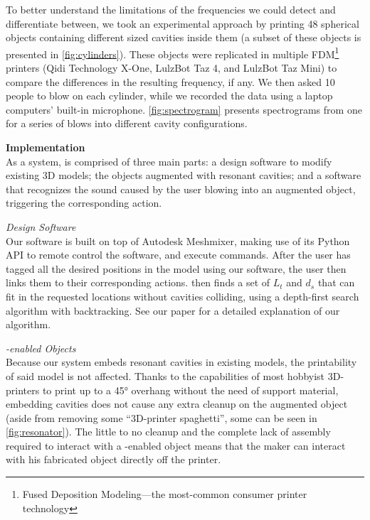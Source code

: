         To better understand the limitations of the frequencies we could detect
        and differentiate between, we took an experimental approach by printing
        48 spherical objects containing different sized cavities inside them (a
        subset of these objects is presented in \cref{fig:cylinders}).  These
        objects were replicated in multiple FDM\footnote{Fused Deposition
        Modeling---the most-common consumer printer technology} printers (Qidi
        Technology X-One, LulzBot Taz 4, and LulzBot Taz Mini) to compare the
        differences in the resulting frequency, if any. We then asked 10 people
        to blow on each cylinder, while we recorded the data using a laptop
        computers' built-in microphone.  \cref{fig:spectrogram} presents
        spectrograms from one for a series of blows into different cavity
        configurations.

        \textbf{Implementation}\\
          As a system, \bh is comprised of three main parts: a design software
          to modify existing 3D models; the objects augmented with resonant
          cavities; and a software that recognizes the sound caused by the user
          blowing into an augmented object, triggering the corresponding
          action.

          \textit{Design Software}\\
            Our software is built on top of Autodesk Meshmixer, making use of
            its Python API to remote control the software, and execute
            commands.  After the user has tagged all the desired positions in
            the model using our software, the user then links them to their
            corresponding actions. \bh then finds a set of $L_t$ and $d_s$ that
            can fit in the requested locations without cavities colliding,
            using a depth-first search algorithm with backtracking. See our
            paper for a detailed explanation of our algorithm.

          \textit{\bh-enabled Objects}\\
            Because our system embeds resonant cavities in existing models, the
            printability of said model is not affected. Thanks to the
            capabilities of most hobbyist 3D-printers to print up to a 45°
            overhang without the need of support material, embedding \bh
            cavities does not cause any extra cleanup on the augmented object
            (aside from removing some ``3D-printer spaghetti'', some can be
            seen in \cref{fig:resonator}). The little to no cleanup and the
            complete lack of assembly required to interact with a \bh-enabled
            object means that the maker can interact with his fabricated object
            directly off the printer.


